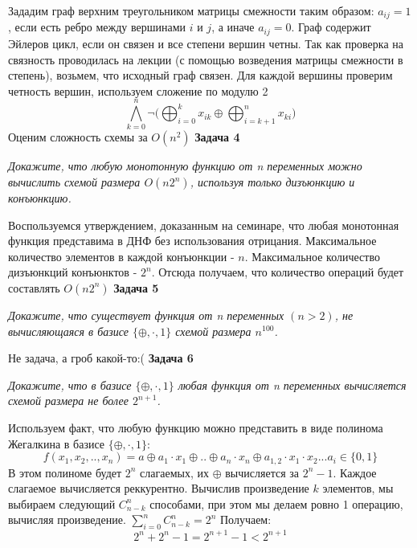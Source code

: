 \documentclass{article}
\begin{document}
Зададим граф верхним треугольником матрицы смежности таким образом: $a_{ij} = 1$, если есть ребро между вершинами $i$ и $j$, а иначе $a_{ij} = 0$. Граф содержит Эйлеров цикл, если он связен и все степени вершин четны. Так как проверка на связность проводилась на лекции (с помощью возведения матрицы смежности в степень), возьмем, что исходный граф связен. Для каждой вершины проверим четность вершин, используем сложение по модулю 2
$$\bigwedge ^{n}_{k=0}\neg\big(\bigoplus ^{k}_{i=0}x_{ik}\oplus \bigoplus ^{n}_{i=k+1}x_{ki}\big)$$
Оценим сложность схемы за $O(n^2)$
\newline
\newline
  \noindent \textbf{Задача 4}
\begin{center}
\textit{Докажите, что любую монотонную функцию от n переменных можно вычислить схемой размера $O(n2^n)$, используя только дизъюнкцию и конъюнкцию.}
\end{center}
Воспользуемся утверждением, доказанным на семинаре, что любая монотонная функция представима в ДНФ без использования отрицания. Максимальное количество элементов в каждой конъюнкции - $n$. Максимальное количество дизъюнкций конъюнктов - $2^n$. Отсюда получаем, что количество операций будет составлять $O(n2^n)$
\newline \newline
 \noindent \textbf{Задача 5}
\begin{center}
\textit{Докажите, что существует функция от n переменных $(n > 2)$, не вычисляющаяся в базисе $\{\oplus, \cdot, 1\}$ схемой размера $n^{100}$.} 
\end{center}
Не задача, а гроб какой-то:(
\newline \newline
 \noindent \textbf{Задача 6}
\begin{center}
\textit{Докажите, что в базисе $\{\oplus, \cdot, 1\}$ любая функция от n переменных вычисляется схемой размера не более $2^{n+1}$.}
\end{center}
Используем факт, что любую функцию можно представить в виде полинома Жегалкина в базисе $\{\oplus, \cdot, 1\}$:
$$f(x_1, x_2,..,x_n) = a \oplus a_1 \cdot x_1 \oplus .. \oplus a_n \cdot x_n \oplus a_{1,2} \cdot x_1 \cdot x_2... a_i \in \{0, 1\}$$
В этом полиноме будет $2^n$ слагаемых, их $\oplus$ вычисляется за $2^n - 1$. Каждое слагаемое вычисляется реккурентно. Вычислив произведение $k$ элементов, мы выбираем следующий $C^n_{n-k}$ способами, при этом мы делаем ровно 1 операцию, вычисляя произведение. $\sum^n_{i=0}C^n_{n-k}=2^n$ Получаем:
$$2^n+2^n-1=2^{n+1} -1 < 2^{n+1} $$
\end{document}
